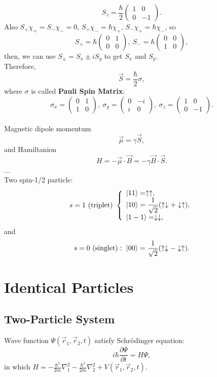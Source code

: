 \documentclass[12pt, 
]{article}
\begin{document}
\[
	S_z=\frac{\hbar}{2} \begin{pmatrix}
		1&0\\0&-1
	\end{pmatrix}.
\]
Also $S_+\chi_+=S_{-}\chi_{-}=0$, $S_+\chi_{-}=\hbar\chi_+$, $S_{-}\chi_+=\hbar\chi_{-}$, so
\[
	S_+=\hbar \begin{pmatrix}
		 0&1\\0&0
	\end{pmatrix},~S_{-}=\hbar \begin{pmatrix}
		0&0\\1&0
	\end{pmatrix},
\]
then, we can use $S_\pm=S_x\pm iS_y$ to get $S_x$ and $S_y$.\\
Therefore, $$\vec{S}=\frac{\hbar}{2}\sigma,$$where $\sigma$ is called {\bf Pauli Spin Matrix}:
\[
	\sigma_x= \begin{pmatrix}
		0&1\\1&0
	\end{pmatrix},~\sigma_y= \begin{pmatrix}
		0&-i\\i&0
	\end{pmatrix},~\sigma_z= \begin{pmatrix}
		1&0\\0&-1
	\end{pmatrix}.
\]
~\\
Magnetic dipole momentum 
\[
	\vec{\mu}=\gamma\vec{S},
\]
and Hamiltanion 
\[
	H=-\vec{\mu}\cdot\vec{B}=-\gamma\vec{B}\cdot\vec{S}.
\]
...\\

\noindent Two spin-1/2 particle:
\[
	s=1~({\rm triplet})~\left\{
	\begin{array}{l}
		\ket{11}=\uparrow\uparrow ,\\
		\ket{10}=\dfrac{1}{\sqrt{2}}(\uparrow\downarrow+\downarrow\uparrow) ,\\
		\ket{1-1}=\downarrow\downarrow,
	\end{array}\right.
\]
and
\[
	s=0~(\rm singlet):~\ket{00}=\frac{1}{\sqrt{2}}(\uparrow\downarrow-\downarrow\uparrow).
\]
\newpage
\section{Identical Particles}
\subsection{Two-Particle System}
Wave function $\varPsi(\vec{r}_1,\vec{r}_2,t)$ satisfy Schr\"odinger equation:
\[
	i\hbar\frac{\partial\varPsi}{\partial t}=H\varPsi,
\]
in which $\displaystyle H=-\frac{\hbar^2}{2m}\nabla^2_1-\frac{\hbar^2}{2m}\nabla_2^2+V(\vec{r}_1,\vec{r}_2,t).$\\~
\end{document}
